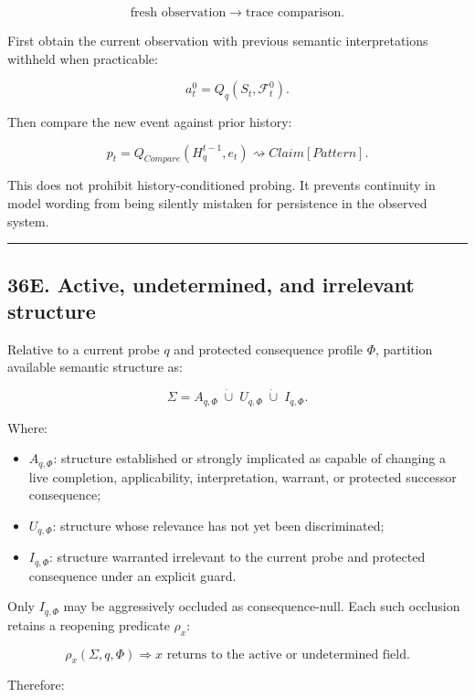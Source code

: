 \documentclass[
]{article}
\providecommand{\tightlist}{%
  \setlength{\itemsep}{0pt}\setlength{\parskip}{0pt}}
\begin{document}
\[
\boxed{
\text{fresh observation}
\to
\text{trace comparison}.
}
\]

First obtain the current observation with previous semantic interpretations
withheld when practicable:

\[
a_t^0=Q_q(S_t,\mathcal F_t^0).
\]

Then compare the new event against prior history:

\[
p_t
=
Q_{Compare}(H_q^{t-1},e_t)
\rightsquigarrow
Claim[Pattern].
\]

This does not prohibit history-conditioned probing. It prevents continuity in
model wording from being silently mistaken for persistence in the observed
system.

\begin{center}\rule{0.5\linewidth}{0.5pt}\end{center}

\subsection{36E. Active, undetermined, and irrelevant
structure}\label{active-undetermined-and-irrelevant-structure}

Relative to a current probe \(q\) and protected consequence profile \(\Phi\),
partition available semantic structure as:

\[
\boxed{
\Sigma
=
A_{q,\Phi}
\;\dot\cup\;
U_{q,\Phi}
\;\dot\cup\;
I_{q,\Phi}.
}
\]

Where:

\begin{itemize}
\tightlist
\item \(A_{q,\Phi}\): structure established or strongly implicated as capable
  of changing a live completion, applicability, interpretation, warrant, or
  protected successor consequence;
\item \(U_{q,\Phi}\): structure whose relevance has not yet been discriminated;
\item \(I_{q,\Phi}\): structure warranted irrelevant to the current probe and
  protected consequence under an explicit guard.
\end{itemize}

Only \(I_{q,\Phi}\) may be aggressively occluded as consequence-null. Each such
occlusion retains a reopening predicate \(\rho_x\):

\[
\boxed{
\rho_x(\Sigma,q,\Phi)
\Rightarrow
x\text{ returns to the active or undetermined field.}
}
\]

Therefore:
\end{document}
